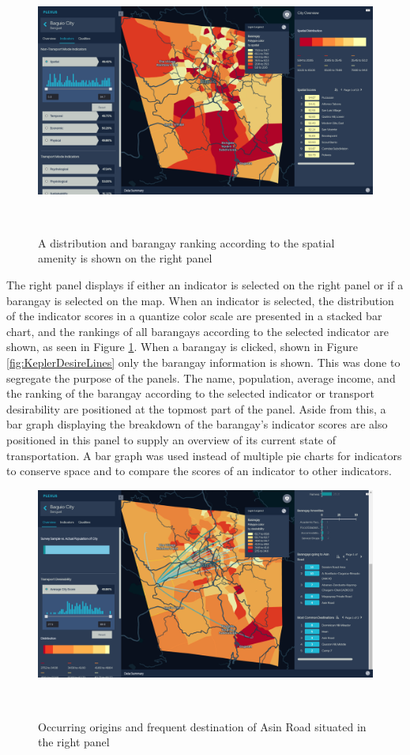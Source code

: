 \documentclass{sigchi}
\begin{document}
\begin{figure}
\centering
  \includegraphics[width=0.9\columnwidth]{figures/indicator.PNG}
  \caption{A distribution and barangay ranking according to the spatial amenity is shown on the right panel}~\label{fig:KeplerIndicatorActive}
\end{figure}

The right panel displays if either an indicator is selected on the right panel or if a barangay is selected on the map. When an indicator is selected, the distribution of the indicator scores in a quantize color scale are presented in a stacked bar chart, and the rankings of all barangays according to the selected indicator are shown, as seen in Figure \ref{fig:KeplerIndicatorActive}. When a barangay is clicked, shown in Figure \ref{fig:KeplerDesireLines} only the barangay information is shown. This was done to segregate the purpose of the panels. The name, population, average income, and the ranking of the barangay according to the selected indicator or transport desirability are positioned at the topmost part of the panel. Aside from this, a bar graph displaying the breakdown of the barangay’s indicator scores are also positioned in this panel to supply an overview of its current state of transportation. A bar graph was used instead of multiple pie charts for indicators to conserve space and to compare the scores of an indicator to other indicators.

\begin{figure}
\centering
  \includegraphics[width=0.9\columnwidth]{figures/overview-barangay-2.PNG}
  \caption{Occurring origins and frequent destination of Asin Road situated in the right panel}~\label{fig:KeplerBarangayContd}
\end{figure}
\end{document}

